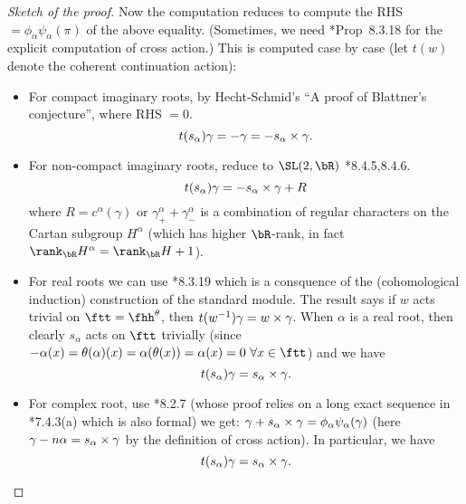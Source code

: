 \documentclass[12pt,a4paper]{amsart}
\numberwithin{equation}{section}
\theoremstyle{remark}
\begin{document}
\begin{proof}[Sketch of the proof]
{    Now the computation reduces to compute the RHS
    $=\phi_{\alpha} \psi_{\alpha} (\pi)$ of the above equality. (Sometimes, we
    need \cite{Vg}*{Prop~8.3.18} for the explicit computation of cross action.)
    This is computed case by case (let $t(w)$ denote the coherent continuation
    action):
    \begin{itemize}
      \item For compact imaginary roots, by Hecht-Schmid's ``A proof of
      Blattner's conjecture'', where RHS $=0$.
      \[
        t(s_{\alpha}) \gamma = - \gamma = - s_{\alpha}\times \gamma.
      \]
      \item For non-compact imaginary roots, reduce to $\SL(2,\bR)$
      \cite{Vg}*{8.4.5,8.4.6}.
      \[
        t(s_{\alpha}) \gamma = - s_{\alpha}\times \gamma + R
      \]
      where $R = c^{\alpha}(\gamma)$ or
      $\gamma^{\alpha}_{+}+\gamma^{\alpha}_{-}$ is a combination of
      regular characters on the Cartan subgroup $H^{\alpha}$ (which has
      higher $\bR$-rank, in fact
      $\rank_{\bR}H^{\alpha} = \rank_{\bR} H +1$).
      \item For real roots we can use \cite{Vg}*{8.3.19} which is a consquence
      of the (cohomological induction) construction of the standard
      module. The result says if $w$ acts trivial on $\ftt=\fhh^{\theta}$,
      then $t(w^{-1})\gamma = w\times \gamma$. When $\alpha$ is a real
      root, then clearly $s_{\alpha}$ acts on $\ftt$ trivially (since
      $-\alpha(x) = \theta(\alpha)(x) = \alpha(\theta(x)) = \alpha(x) = 0
      \ \forall x\in \ftt$)
      and we have
      \[
        t(s_{\alpha}) \gamma = s_{\alpha}\times \gamma.
      \]
      \item For complex root, use \cite{Vg}*{8.2.7} (whose proof relies on a
      long exact sequence in \cite{Vg}*{7.4.3(a)} which is also formal) we get:
      $\gamma + s_{\alpha}\times \gamma = \phi_{\alpha} \psi_{\alpha} (\gamma)$
      (here $\gamma-n\alpha = s_{\alpha}\times \gamma$ by the definition of
      cross action).
      In particular, we have
      \[
        t(s_{\alpha}) \gamma = s_{\alpha}\times \gamma.
      \]
    \end{itemize}
 }


\end{proof}
\end{document}
